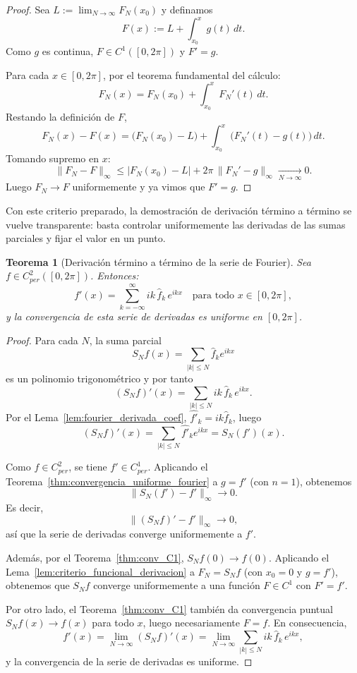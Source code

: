 \documentclass[a4paper,11pt]{report}
\newtheorem{theorem}{Teorema}[chapter]
\begin{document}
\begin{proof}
Sea $L:=\lim_{N\to\infty}F_N(x_0)$ y definamos
\[
F(x):=L+\int_{x_0}^x g(t)\,dt.
\]
Como $g$ es continua, $F\in C^1([0,2\pi])$ y $F'=g$.

Para cada $x\in[0,2\pi]$, por el teorema fundamental del cálculo:
\[
F_N(x)=F_N(x_0)+\int_{x_0}^x F_N'(t)\,dt.
\]
Restando la definición de $F$,
\[
F_N(x)-F(x)=\big(F_N(x_0)-L\big)+\int_{x_0}^x\big(F_N'(t)-g(t)\big)\,dt.
\]
Tomando supremo en $x$:
\[
\|F_N-F\|_\infty
\le |F_N(x_0)-L|+2\pi\,\|F_N'-g\|_\infty\xrightarrow[N\to\infty]{}0.
\]
Luego $F_N\to F$ uniformemente y ya vimos que $F'=g$.
\end{proof}

Con este criterio preparado, la demostraci\'on de derivaci\'on t\'ermino a t\'ermino se vuelve transparente: basta controlar uniformemente las derivadas de las sumas parciales y fijar el valor en un punto.

\begin{theorem}[Derivación término a término de la serie de Fourier]\label{thm:derivacion_termino_termino_fourier}
Sea $f\in C^2_{per}([0,2\pi])$. Entonces:
\[
f'(x)=\sum_{k=-\infty}^{\infty} ik\,\hat f_k\,e^{ikx}
\quad\text{para todo }x\in[0,2\pi],
\]
y la convergencia de esta serie de derivadas es uniforme en $[0,2\pi]$.
\end{theorem}

\begin{proof}
Para cada $N$, la suma parcial
\[
S_N f(x)=\sum_{|k|\le N}\hat f_k e^{ikx}
\]
es un polinomio trigonométrico y por tanto
\[
(S_N f)'(x)=\sum_{|k|\le N} ik\,\hat f_k\,e^{ikx}.
\]
Por el Lema~\ref{lem:fourier_derivada_coef}, $\widehat{f'}_k=ik\hat f_k$, luego
\[
(S_N f)'(x)=\sum_{|k|\le N}\widehat{f'}_k e^{ikx}=S_N(f')(x).
\]

Como $f\in C^2_{per}$, se tiene $f'\in C^1_{per}$. Aplicando el Teorema~\ref{thm:convergencia_uniforme_fourier} a $g=f'$ (con $n=1$), obtenemos
\[
\|S_N(f')-f'\|_\infty\to 0.
\]
Es decir,
\[
\|(S_N f)'-f'\|_\infty\to 0,
\]
así que la serie de derivadas converge uniformemente a $f'$.

Además, por el Teorema~\ref{thm:conv_C1}, $S_N f(0)\to f(0)$. Aplicando el Lema~\ref{lem:criterio_funcional_derivacion} a $F_N=S_N f$ (con $x_0=0$ y $g=f'$), obtenemos que $S_N f$ converge uniformemente a una función $F\in C^1$ con $F'=f'$.

Por otro lado, el Teorema~\ref{thm:conv_C1} también da convergencia puntual $S_N f(x)\to f(x)$ para todo $x$, luego necesariamente $F=f$. En consecuencia,
\[
f'(x)=\lim_{N\to\infty}(S_N f)'(x)=\lim_{N\to\infty}\sum_{|k|\le N} ik\,\hat f_k\,e^{ikx},
\]
y la convergencia de la serie de derivadas es uniforme.
\end{proof}
\end{document}
